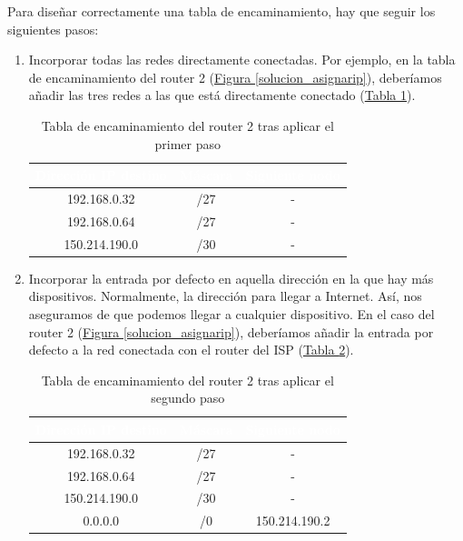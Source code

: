 \documentclass[10pt,a4paper,spanish]{report}
\begin{document}
Para diseñar correctamente una tabla de encaminamiento, hay que seguir los siguientes pasos:
\begin{enumerate}[1.]
  \item Incorporar todas las redes directamente conectadas. Por ejemplo, en la tabla de encaminamiento del router 2 (\hyperref[solucion_asignarip]{Figura \ref*{solucion_asignarip}}), deberíamos añadir las tres redes a las que está directamente conectado (\hyperref[tablar2]{Tabla \ref*{tablar2}}).

  \begin{table}[H]
    \centering
    \begin{tabular}{|c|c|c|}
     \hline
    \rowcolor[rgb]{0.0,0.58,0.71} \textcolor{white}{Dirección IP destino} & \textcolor{white}{Máscara} & \textcolor{white}{Siguiente nodo} \\
    \hline
     192.168.0.32 & /27 & - \\
    \hline
     192.168.0.64 & /27 & - \\
    \hline
     150.214.190.0 & /30 & - \\
    \hline
    \end{tabular}
    \caption{Tabla de encaminamiento del router 2 tras aplicar el primer paso}
    \label{tablar2}
  \end{table}

  \item Incorporar la entrada por defecto en aquella dirección en la que hay más dispositivos. Normalmente, la dirección para llegar a Internet. Así, nos aseguramos de que podemos llegar a cualquier dispositivo. En el caso del router 2 (\hyperref[solucion_asignarip]{Figura \ref*{solucion_asignarip}}), deberíamos añadir la entrada por defecto a la red conectada con el router del ISP (\hyperref[tablar21]{Tabla \ref*{tablar21}}).

  \begin{table}[H]
    \centering
    \begin{tabular}{|c|c|c|}
     \hline
    \rowcolor[rgb]{0.0,0.58,0.71} \textcolor{white}{Dirección IP destino} & \textcolor{white}{Máscara} & \textcolor{white}{Siguiente nodo} \\
    \hline
     192.168.0.32 & /27 & - \\
    \hline
     192.168.0.64 & /27 & - \\
    \hline
     150.214.190.0 & /30 & - \\
    \hline
     0.0.0.0 & /0 & 150.214.190.2 \\
    \hline
    \end{tabular}
    \caption{Tabla de encaminamiento del router 2 tras aplicar el segundo paso}
    \label{tablar21}
  \end{table}


\end{enumerate}
\end{document}
